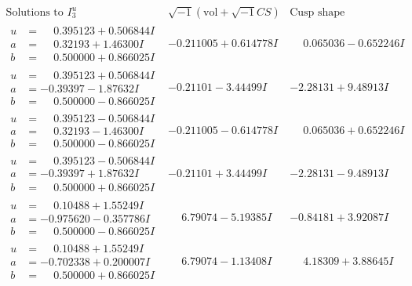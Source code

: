 \documentclass[1p]{elsarticle_modified}
\theoremstyle{definition}
\newcommand{\I}{\sqrt{-1}}
\begin{document}
$$\begin{array}{c|c|c}  
\text{Solutions to }I^u_{3}& \I (\text{vol} + \sqrt{-1}CS) & \text{Cusp shape}\\
 \hline 
\begin{aligned}
u &= \phantom{-}0.395123 + 0.506844 I \\
a &= \phantom{-}0.32193 + 1.46300 I \\
b &= \phantom{-}0.500000 + 0.866025 I\end{aligned}
 & -0.211005 + 0.614778 I & \phantom{-}0.065036 - 0.652246 I \\ \hline\begin{aligned}
u &= \phantom{-}0.395123 + 0.506844 I \\
a &= -0.39397 - 1.87632 I \\
b &= \phantom{-}0.500000 - 0.866025 I\end{aligned}
 & -0.21101 - 3.44499 I & -2.28131 + 9.48913 I \\ \hline\begin{aligned}
u &= \phantom{-}0.395123 - 0.506844 I \\
a &= \phantom{-}0.32193 - 1.46300 I \\
b &= \phantom{-}0.500000 - 0.866025 I\end{aligned}
 & -0.211005 - 0.614778 I & \phantom{-}0.065036 + 0.652246 I \\ \hline\begin{aligned}
u &= \phantom{-}0.395123 - 0.506844 I \\
a &= -0.39397 + 1.87632 I \\
b &= \phantom{-}0.500000 + 0.866025 I\end{aligned}
 & -0.21101 + 3.44499 I & -2.28131 - 9.48913 I \\ \hline\begin{aligned}
u &= \phantom{-}0.10488 + 1.55249 I \\
a &= -0.975620 - 0.357786 I \\
b &= \phantom{-}0.500000 - 0.866025 I\end{aligned}
 & \phantom{-}6.79074 - 5.19385 I & -0.84181 + 3.92087 I \\ \hline\begin{aligned}
u &= \phantom{-}0.10488 + 1.55249 I \\
a &= -0.702338 + 0.200007 I \\
b &= \phantom{-}0.500000 + 0.866025 I\end{aligned}
 & \phantom{-}6.79074 - 1.13408 I & \phantom{-}4.18309 + 3.88645 I \\ \hline\begin{aligned}

\end{aligned}
\end{array}$$
\end{document}

